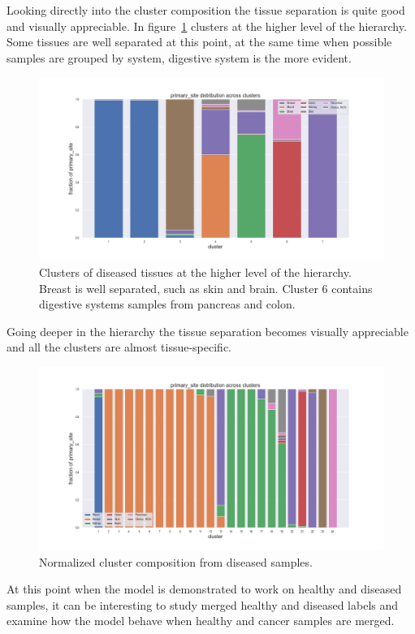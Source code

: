Looking directly into the cluster composition the tissue separation is quite good and visually appreciable. In figure~\ref{fig:topic/tcga/fraction_clustercomposition_l4_primary_site} clusters at the higher level of the hierarchy. Some tissues are well separated at this point, at the same time when possible samples are grouped by system, digestive system is the more evident.
\begin{figure}[htb!]
	\centering
	\includegraphics[width=0.8\linewidth]{pictures/topic/tcga/fraction_clustercomposition_l4_primary_site.png}
	\caption{Clusters of diseased tissues at the higher level of the hierarchy. Breast is well separated, such as skin and brain. Cluster 6 contains digestive systems samples from pancreas and colon.}
	\label{fig:topic/tcga/fraction_clustercomposition_l4_primary_site}
\end{figure}
Going deeper in the hierarchy the tissue separation becomes visually appreciable and all the clusters are almost tissue-specific.
\begin{figure}[htb!]
	\centering
	\includegraphics[width=0.8\linewidth]{pictures/topic/tcga/fraction_clustercomposition_l3_primary_site.png}
	\caption{Normalized cluster composition from diseased samples.}
	\label{fig:topic/tcga/fraction_clustercomposition_l3_primary_site}
\end{figure}
\FloatBarrier
At this point when the model is demonstrated to work on healthy and diseased samples, it can be interesting to study merged healthy and diseased labels and examine how the model behave when healthy and cancer samples are merged.